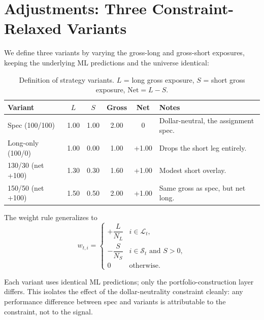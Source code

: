 \documentclass[11pt]{article}
\begin{document}
\section{Adjustments: Three Constraint-Relaxed Variants}
\label{sec:variants}
We define three variants by varying the gross-long and gross-short exposures, keeping the
underlying ML predictions and the universe identical:

\begin{table}[h]
\centering
\caption{Definition of strategy variants. $L$ = long gross exposure, $S$ = short gross
exposure, $\text{Net} = L - S$.}
\label{tab:variants_def}
\begin{tabular}{lccccl}
\toprule
Variant & $L$ & $S$ & Gross & Net & Notes \\
\midrule
Spec (100/100)       & 1.00 & 1.00 & 2.00 & 0    & Dollar-neutral, the assignment spec. \\
Long-only (100/0)    & 1.00 & 0.00 & 1.00 & +1.00 & Drops the short leg entirely. \\
130/30 (net +100)    & 1.30 & 0.30 & 1.60 & +1.00 & Modest short overlay. \\
150/50 (net +100)    & 1.50 & 0.50 & 2.00 & +1.00 & Same gross as spec, but net long. \\
\bottomrule
\end{tabular}
\end{table}

The weight rule generalizes to
\begin{equation}
w_{t,i} = \begin{cases}
+\dfrac{L}{N_L} & i \in \mathcal{L}_t, \\[6pt]
-\dfrac{S}{N_S} & i \in \mathcal{S}_t \text{ and } S>0, \\[6pt]
0 & \text{otherwise}.
\end{cases}
\end{equation}

Each variant uses identical ML predictions; only the portfolio-construction layer
differs. This isolates the effect of the dollar-neutrality constraint cleanly: any
performance difference between spec and variants is attributable to the constraint, not
to the signal.
\end{document}

